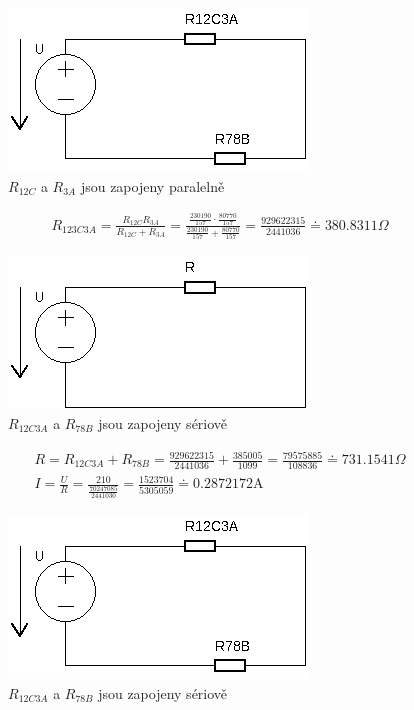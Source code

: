 \documentclass[12pt,a4paper]{article}
\begin{document}
\begin{figure}[H]
		\center\includegraphics[width=0.6\linewidth]{img3.png}
		\caption*{$R_{12C}$ a $R_{3A}$ jsou zapojeny paralelně}
\end{figure}
\begin{gather*}
	R_{123C3A} = \frac{R_{12C} R_{3A}}{R_{12C} + R_{3A}} = \frac{\frac{230190}{157}\cdot\frac{80770}{157}}{\frac{230190}{157} + \frac{80770}{157}} = \frac{929622315}{2441036} \doteq 380.8311 \Omega
\end{gather*}
\begin{figure}[H]
\center\includegraphics[width=0.6\linewidth]{img4.png}
		\caption*{$R_{12C3A}$ a $R_{78B}$ jsou zapojeny sériově}
\end{figure}
\begin{gather*}
	R = R_{12C3A} + R_{78B} = \frac{929622315}{2441036} + \frac{385005}{1099} = \frac{79575885}{108836} \doteq 731.1541 \Omega \\[0.2cm]
	I = \frac{U}{R} = \frac{210}{\frac{70247085}{2441030}} = \frac{1523704}{5305059} \doteq 0.2872172 \text{A}
\end{gather*}
\begin{figure}[H]
		\center\includegraphics[width=0.6\linewidth]{img3.png}
		\caption*{$R_{12C3A}$ a $R_{78B}$ jsou zapojeny sériově}
\end{figure}
\end{document}
